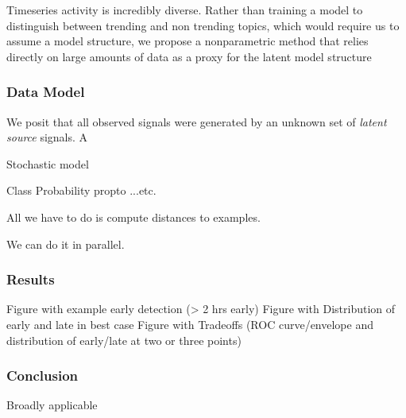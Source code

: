 \documentclass[10pt]{article}
\begin{document}
Timeseries activity is incredibly diverse. Rather than training
a model to distinguish between trending and non trending topics, which
would require us to assume a model structure, we propose a
nonparametric method that relies directly on large amounts of data as
a proxy for the latent model structure


\subsubsection*{Data Model}
We posit that all observed signals were generated by an unknown set of
{\em latent source} signals. A

Stochastic model

Class Probability propto ...etc. 

All we have to do is compute distances to examples. 

We can do it in parallel.

\subsubsection*{Results}
Figure with example early detection (> 2 hrs early)
Figure with Distribution of early and late in best case
Figure with Tradeoffs (ROC curve/envelope and distribution of early/late at two or three points)

\subsubsection*{Conclusion}
Broadly applicable

\begin{footnotesize}


\end{footnotesize}
\end{document}
